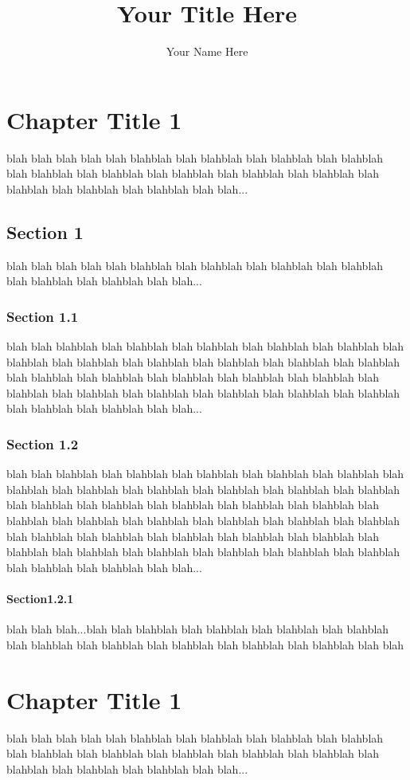 \documentclass{report}
\author{Your Name Here}
\title{Your Title Here}
\begin{document}
\maketitle
\tableofcontents
\chapter{Chapter Title 1}
blah blah blah blah blah blahblah blah blahblah blah blahblah blah blahblah blah blahblah blah blahblah blah blahblah blah blahblah blah blahblah blah blahblah blah blahblah blah blahblah blah blah...
\section{Section 1}
blah blah blah blah blah blahblah blah blahblah blah blahblah blah blahblah blah blahblah blah blahblah blah blah...
\subsection{Section 1.1}
blah blah blahblah blah blahblah blah blahblah blah blahblah blah blahblah blah blahblah blah blahblah blah blahblah blah blahblah blah blahblah blah blahblah blah blahblah blah blahblah blah blahblah blah blahblah blah blahblah blah blahblah blah blahblah blah blahblah blah blahblah blah blahblah blah blahblah blah blahblah blah blahblah blah blah...
\subsection{Section 1.2}
blah blah blahblah blah blahblah blah blahblah blah blahblah blah blahblah blah blahblah blah blahblah blah blahblah blah blahblah blah blahblah blah blahblah blah blahblah blah blahblah blah blahblah blah blahblah blah blahblah blah blahblah blah blahblah blah blahblah blah blahblah blah blahblah blah blahblah blah blahblah blah blahblah blah blahblah blah blahblah blah blahblah blah blahblah blah blahblah blah blahblah blah blahblah blah blahblah blah blahblah blah blahblah blah blahblah blah blah...
\subsubsection{Section1.2.1}
blah blah blah...blah blah blahblah blah blahblah blah blahblah blah blahblah blah blahblah blah blahblah blah blahblah blah blahblah blah blahblah blah blah
\chapter{Chapter Title 1}
blah blah blah blah blah blahblah blah blahblah blah blahblah blah blahblah blah blahblah blah blahblah blah blahblah blah blahblah blah blahblah blah blahblah blah blahblah blah blahblah blah blah...
\end{document}
